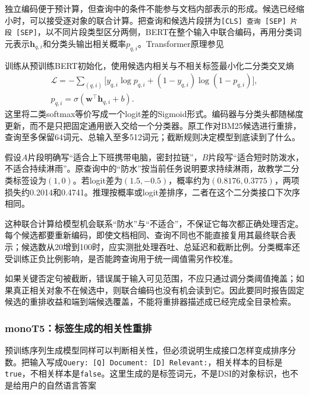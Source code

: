 独立编码便于预计算，但查询中的条件不能参与文档内部表示的形成。候选已经缩小时，可以接受逐对象的联合计算。把查询和候选片段拼为\texttt{[CLS] 查询 [SEP] 片段 [SEP]}，以不同片段类型区分两侧，BERT在整个输入中联合编码，再用分类词元表示$\bm h_{q,i}$和分类头输出相关概率$p_{q,i}$。Transformer原理参见

训练从预训练BERT初始化，使用候选内相关与不相关标签最小化二分类交叉熵
\begin{equation}
 \begin{split}
 \mathcal L=-\sum_{(q,i)}
  \bigl[y_{q,i}\log p_{q,i}+(1-y_{q,i})\log(1-p_{q,i})\bigr],\\
 p_{q,i}=\sigma(\bm w^\top\bm h_{q,i}+b).
 \end{split}
 \label{eq:rs-search-monobert}
\end{equation}
这里将二类softmax等价写成一个logit差的Sigmoid形式。编码器与分类头都随梯度更新，而不是只把固定通用嵌入交给一个分类器。原工作对BM25候选进行重排，查询至多保留64词元、总输入至多512词元；截断规则决定模型到底读到了什么。

假设$A$片段明确写“适合上下班携带电脑，密封拉链”，$B$片段写“适合短时防泼水，不适合持续淋雨”。原查询中的“防水”按当前任务说明要求持续淋雨，故教学二分类标签设为$(1,0)$。若logit差为$(1.5,-0.5)$，概率约为$(0.8176,0.3775)$，两项损失约0.2014和0.4741。推理按概率或logit差排序，二者在这个二分类接口下次序相同。

这种联合计算给模型机会联系“防水”与“不适合”，不保证它每次都正确处理否定。每个候选都要重新编码，即使文档相同、查询不同也不能直接复用其最终联合表示；候选数从20增到100时，应实测批处理吞吐、总延迟和截断比例。分类概率还受训练正负比例影响，是否能跨查询用于统一阈值需另作校准。

如果关键否定句被截断，错误属于输入可见范围，不应只通过调分类阈值掩盖；如果真正相关对象不在候选中，则联合编码也没有机会读到它。因此要同时报告固定候选的重排收益和端到端候选覆盖，不能将重排器描述成已经完成全目录检索。

\Needspace{100mm}
\subsubsection{monoT5：标签生成的相关性重排}
\label{sec:rs-search-monot5}

预训练序列生成模型同样可以判断相关性，但必须说明生成接口怎样变成排序分数。把输入写成\texttt{Query: [Q] Document: [D] Relevant:}，相关样本的目标是\texttt{true}，不相关样本是\texttt{false}。这里生成的是标签词元，不是DSI的对象标识，也不是给用户的自然语言答案

